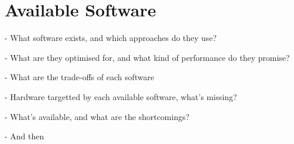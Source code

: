 
\section{Available Software}\label{chpt:fmm:sec:software}

- What software exists, and which approaches do they use?

- What are they optimised for, and what kind of performance do they promise?

- What are the trade-offs of each software

- Hardware targetted by each available software, what's missing?

- What's available, and what are the shortcomings?

- And then